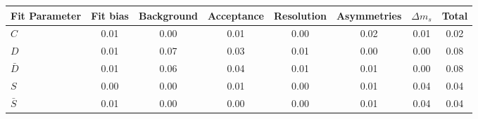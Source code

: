 \begin{tabular}{l  c  c  c  c  c  c  | c }
\hline
\hline
Fit Parameter & Fit bias & Background & Acceptance & Resolution & Asymmetries & $\Delta m_{s}$ &  Total  \\ 
\hline
$C$ & 0.01 & 0.00 & 0.01 & 0.00 & 0.02 & 0.01 & 0.02 \\ 
$D$ & 0.01 & 0.07 & 0.03 & 0.01 & 0.00 & 0.00 & 0.08 \\ 
$\bar{D}$ & 0.01 & 0.06 & 0.04 & 0.01 & 0.01 & 0.00 & 0.08 \\ 
$S$ & 0.00 & 0.00 & 0.01 & 0.00 & 0.01 & 0.04 & 0.04 \\ 
$\bar{S}$ & 0.01 & 0.00 & 0.00 & 0.00 & 0.01 & 0.04 & 0.04 \\ 
\hline
\hline
\end{tabular}
